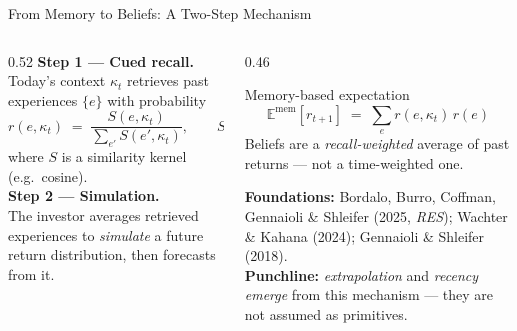 \documentclass[aspectratio=169, 11pt]{beamer}
\begin{document}
\begin{frame}{From Memory to Beliefs: A Two-Step Mechanism}
\begin{columns}[T]
\begin{column}{0.52\textwidth}
\textbf{Step 1 --- Cued recall.}\\[0.3em]
Today's context $\kappa_t$ retrieves past experiences $\{e\}$ with probability
\[
r(e,\kappa_t) \;=\; \frac{S(e,\kappa_t)}{\sum_{e'} S(e',\kappa_t)}, \qquad S(e,\kappa_t)\in[0,1]
\]
where $S$ is a similarity kernel (e.g.\ cosine).
\\[0.6em]
\textbf{Step 2 --- Simulation.}\\[0.3em]
The investor averages retrieved experiences to \emph{simulate} a future return distribution, then forecasts from it.
\end{column}
\begin{column}{0.46\textwidth}
\begin{block}{Memory-based expectation}
\[
\mathbb{E}^{\text{mem}}[r_{t+1}] \;=\; \sum_{e} r(e,\kappa_t)\, r(e)
\]
Beliefs are a \emph{recall-weighted} average of past returns --- not a time-weighted one.
\end{block}
\vspace{0.4em}
\footnotesize
\textbf{Foundations:} Bordalo, Burro, Coffman, Gennaioli \& Shleifer (2025, \textit{RES}); Wachter \& Kahana (2024); Gennaioli \& Shleifer (2018).
\\[0.3em]
\textbf{Punchline:} \emph{extrapolation} and \emph{recency} \emph{emerge} from this mechanism --- they are not assumed as primitives.
\end{column}
\end{columns}
\end{frame}
\end{document}
